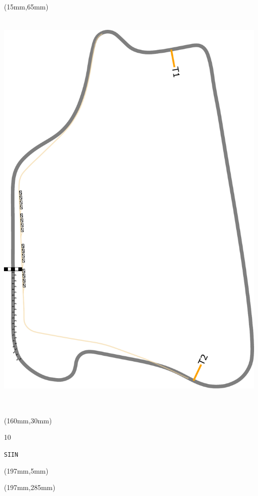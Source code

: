 \begin{textblock*}{185mm}(15mm,65mm)%
\centering
\mbox{\includegraphics[width=185mm,height=210mm,keepaspectratio]{PT/SIIN.pdf}}
\end{textblock*}
\begin{textblock*}{40mm}(160mm,30mm)%
\Large
\par{} 
\par10 
\par\hfill\tiny\tt SIIN\\
\end{textblock*}
\begin{textblock*}{20mm}(197mm,5mm)%
\fbox{\thepage}
\label{SIIN}
\end{textblock*}
\begin{textblock*}{20mm}(197mm,285mm)%
\fbox{\thepage}
\end{textblock*}

